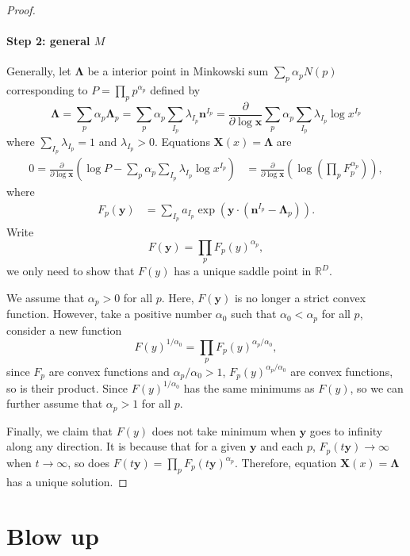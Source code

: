 \documentclass[12pt]{article}
\theoremstyle{definition}
\theoremstyle{plain}
\begin{document}
\begin{proof}
\paragraph{Step 2: general $M$}
Generally, let $\mathbf{\Lambda}$ be a interior point in Minkowski sum $\sum_p \alpha_p N(p)$ corresponding to $P=\prod_p p^{\alpha_p}$ defined by 
\[
	\mathbf{\Lambda}
	=\sum_p \alpha_p \mathbf{\Lambda}_p
	=\sum_p \alpha_p \sum_{I_p}\lambda_{I_p}\mathbf{n}^{I_p}
	=\frac{\partial}{\partial \log \mathbf{x}}\sum_{p}\alpha_p\sum_{I_p}\lambda_{I_p} \log x^{I_p}
\]
where $\sum_{I_p} \lambda_{I_p}=1$ and $\lambda_{I_p} > 0$. Equations $\mathbf{X}(x)=\mathbf{\Lambda}$ are 
\[
\begin{aligned}
	0=\frac{\partial }{\partial \log \mathbf{x}}\left(
	\log P-\sum_{p}\alpha_p\sum_{I_p}\lambda_{I_p} \log x^{I_p}
	\right)&=\frac{\partial }{\partial \log \mathbf{x}}\left(
	\log \left(\prod_p F_p^{\alpha_p}\right)
	\right),
\end{aligned}
\]
where
\[
	\begin{aligned}
		F_p(\mathbf y)&=\sum_{I_p} a_{I_p} \exp\left(\mathbf{y}\cdot \left(\mathbf{n}^{I_p}-\mathbf{\Lambda}_p\right)\right).
	\end{aligned}
\]
Write
\[
	F(\mathbf y)=\prod_p F_p(y)^{\alpha_p},
\]
we only need to show that $F(y)$ has a unique saddle point in $\mathbb R^D$.

We assume that $\alpha_p>0$ for all $p$. Here, $F(\mathbf y)$ is no longer a strict convex function. However, take a positive number $\alpha_0$ such that $\alpha_0< \alpha_p$ for all $p$, consider a new function
\[
	F(y)^{1/\alpha_0}=\prod_p F_p(y)^{\alpha_p/\alpha_0},
\]
since $F_p$ are convex functions and $\alpha_p/\alpha_0>1$, $F_p(y)^{\alpha_p/\alpha_0}$ are convex functions, so is their product. Since $F(y)^{1/\alpha_0}$ has the same minimums as $F(y)$, so we can further assume that $\alpha_p>1$ for all $p$.

Finally, we claim that $F(y)$ does not take minimum when $\mathbf{y}$ goes to infinity along any direction. It is because that for a given $\mathbf{y}$ and each $p$, $F_p(t\mathbf{y})\to \infty$ when $t\to \infty$, so does $F(t\mathbf{y})=\prod_p F_p(t\mathbf{y})^{\alpha_p}$. Therefore, equation $\mathbf{X}(x)=\mathbf{\Lambda}$ has a unique solution.
\end{proof}

\section{Blow up}
\end{document}
